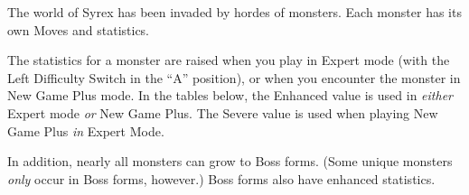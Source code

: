 \documentclass[10pt,twocolumn]{memoir}
\begin{document}
The world of Syrex has been  invaded by hordes of monsters. Each monster
has its own Moves and statistics.

The statistics  for a monster  are raised when  you play in  Expert mode
(with the  Left Difficulty Switch  in the  ``A'' position), or  when you
encounter the  monster in New Game  Plus mode. In the  tables below, the
Enhanced value is  used in \emph{either} Expert mode  \emph{or} New Game
Plus. The  Severe value  is used  when playing  New Game  Plus \emph{in}
Expert Mode.



In addition,  nearly all monsters can  grow to Boss forms.  (Some unique
monsters \emph{only} occur in Boss forms, however.) Boss forms also have
enhanced statistics.

\newcommand\twicely[1]{\the\numexpr#1*2\relax}
\newcommand\thricely[1]{\the\numexpr#1*3\relax}
\newcommand\fourxly[1]{\the\numexpr#1*4\relax}
\newcommand\eightxly[1]{\the\numexpr#1*8\relax}

\newcommand\bytewise[1]{\ifnum #1 > 255
  {255}
  \else
  #1
  \fi}

\newcommand\twice[1]{\bytewise{\twicely{#1}}}
\newcommand\thrice[1]{\bytewise{\thricely{#1}}}
\newcommand\fourx[1]{\bytewise{\fourxly{#1}}}
\newcommand\eightx[1]{\bytewise{\eightxly{#1}}}
\end{document}
